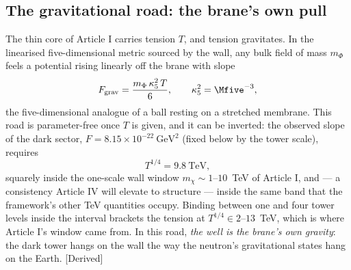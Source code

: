 \subsection{The gravitational road: the brane's own pull}
The thin core of Article I carries tension $T$, and tension gravitates. In the linearised five-dimensional metric sourced by the wall, any bulk field of mass $m_{\Phi}$ feels a potential rising linearly off the brane with slope
\begin{equation}
F_{\rm grav}=\frac{m_{\Phi}\,\kappa_{5}^{2}\,T}{6},\qquad \kappa_{5}^{2}=\Mfive^{-3},
\label{eq:gravslope}
\end{equation}
the five-dimensional analogue of a ball resting on a stretched membrane. This road is parameter-free once $T$ is given, and it can be inverted: the observed slope of the dark sector, $F=8.15\times10^{-22}~\mathrm{GeV}^{2}$ (fixed below by the tower scale), requires
\begin{equation}
T^{1/4}=9.8~\mathrm{TeV},
\end{equation}
squarely inside the one-scale wall window $m_{\chi}\sim1$--$10$~TeV of Article I, and --- a consistency Article IV will elevate to structure --- inside the same band that the framework's other TeV quantities occupy. Binding between one and four tower levels inside the interval brackets the tension at $T^{1/4}\in2$--$13$~TeV, which is where Article I's window came from. In this road, \emph{the well is the brane's own gravity}: the dark tower hangs on the wall the way the neutron's gravitational states hang on the Earth. [Derived]

